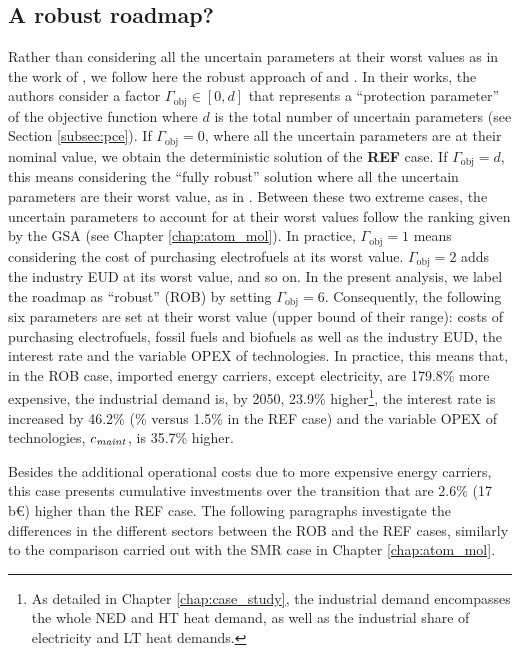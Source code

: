 \subsection{A robust roadmap?}
\label{subsec:RobPol:Rob_roadmap}
Rather than considering all the uncertain parameters at their worst values as in the work of \citet{soyster1973convex}, we follow here the robust approach of \citet{bertsimas2004price} and \citet{Moret2017PhDThesis}. In their works, the authors consider a factor $\Gamma_{\text{obj}}\in [0,d]$ that represents a ``protection parameter'' of the objective function where $d$ is the total number of uncertain parameters (see Section \ref{subsec:pce}). If $\Gamma_{\text{obj}}= 0$, where all the uncertain parameters are at their nominal value, we obtain the deterministic solution of the \textbf{REF} case. If $\Gamma_{\text{obj}}= d$, this means considering the ``fully robust'' solution where all the uncertain parameters are their worst value, as in \citet{soyster1973convex}.  Between these two extreme cases, the uncertain parameters to account for at their worst values follow the ranking given by the \gls{GSA} (see Chapter \ref{chap:atom_mol}). In practice, $\Gamma_{\text{obj}}= 1$ means considering the cost of purchasing electrofuels at its worst value. $\Gamma_{\text{obj}}= 2$ adds the industry \gls{EUD} at its worst value, and so on. In the present analysis, we label the roadmap as ``robust'' (ROB) by setting $\Gamma_{\text{obj}}= 6$. Consequently, the following six parameters are set at their worst value (upper bound of their range): costs of purchasing electrofuels, fossil fuels and biofuels as well as the industry \gls{EUD}, the interest rate and the variable OPEX of technologies. In practice, this means that, in the ROB case, imported energy carriers, except electricity, are 179.8\% more expensive, the industrial demand is, by 2050, 23.9\% higher\footnote{As detailed in Chapter \ref{chap:case_study}, the industrial demand encompasses the whole \gls{NED} and \gls{HT} heat demand, as well as the industrial share of electricity and \gls{LT} heat demands.}, the interest rate is increased by 46.2\% (\% versus 1.5\% in the REF case) and the variable OPEX of technologies, $c_{\text{\emph{maint}}}$, is 35.7\% higher. 

Besides the additional operational costs due to more expensive energy carriers, this case presents cumulative investments over the transition that are 2.6\% (17\,b€) higher than the REF case. The following paragraphs investigate the differences in the different sectors between the ROB and the REF cases, similarly to the comparison carried out with the SMR case in Chapter \ref{chap:atom_mol}.\\

